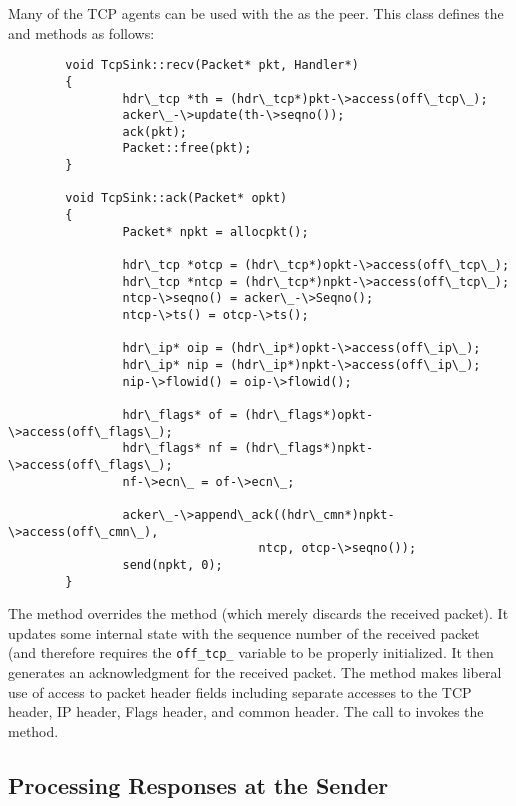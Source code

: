 Many of the TCP agents can be used with the
 as the peer.
This class defines the  and  methods as follows:
\begin{verbatim}
        void TcpSink::recv(Packet* pkt, Handler*)
        {
                hdr\_tcp *th = (hdr\_tcp*)pkt-\>access(off\_tcp\_);
                acker\_-\>update(th-\>seqno());
                ack(pkt);
                Packet::free(pkt);
        }

        void TcpSink::ack(Packet* opkt)
        {
                Packet* npkt = allocpkt();
        
                hdr\_tcp *otcp = (hdr\_tcp*)opkt-\>access(off\_tcp\_);
                hdr\_tcp *ntcp = (hdr\_tcp*)npkt-\>access(off\_tcp\_);
                ntcp-\>seqno() = acker\_-\>Seqno();
                ntcp-\>ts() = otcp-\>ts();
        
                hdr\_ip* oip = (hdr\_ip*)opkt-\>access(off\_ip\_);
                hdr\_ip* nip = (hdr\_ip*)npkt-\>access(off\_ip\_);
                nip-\>flowid() = oip-\>flowid();
        
                hdr\_flags* of = (hdr\_flags*)opkt-\>access(off\_flags\_);
                hdr\_flags* nf = (hdr\_flags*)npkt-\>access(off\_flags\_);
                nf-\>ecn\_ = of-\>ecn\_;
        
                acker\_-\>append\_ack((hdr\_cmn*)npkt-\>access(off\_cmn\_),
                                   ntcp, otcp-\>seqno());
                send(npkt, 0);
        }
\end{verbatim}
The  method overrides the  method
(which merely discards the received packet).
It updates some internal state with the sequence number of the
received packet (and therefore requires the {\tt off\_tcp\_} variable
to be properly initialized.
It then generates an acknowledgment for the received packet.
The  method makes liberal use of access to packet header
fields including separate accesses to the TCP header, IP header,
Flags header, and common header.
The call to  invokes the  method.

\subsection{Processing Responses at the Sender}
\label{sec:tcpsimpleack}

